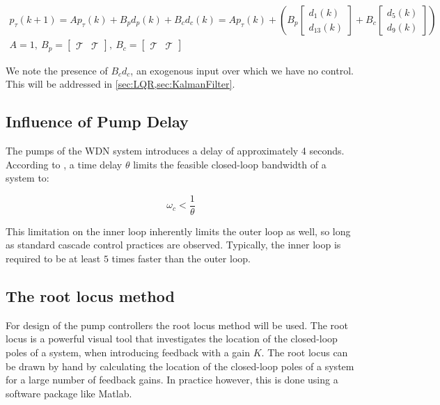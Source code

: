 \begin{equation}\label{eq:TankPressureStateSpace}
	\begin{gathered}
				p_\tau(k+1) = A p_\tau(k) + B_pd_p(k) + B_cd_c(k)
				= A p_\tau(k) + \left(B_p \begin{bmatrix}d_1(k) \\ d_{13}(k)\end{bmatrix} 
				+ B_c\begin{bmatrix}d_5(k) \\ d_9(k)\end{bmatrix}\right) \\      
				A = 1, \ B_p = \begin{bmatrix} \mathcal{T} & \mathcal{T} \end{bmatrix}, \ B_c = \begin{bmatrix} \mathcal{T} & \mathcal{T} \end{bmatrix}
	\end{gathered}
\end{equation}

We note the presence of $B_cd_c$, an exogenous input over which we have no control. This will be addressed in \cref{sec:LQR,sec:KalmanFilter}.

\subsection{Influence of Pump Delay}
The pumps of the WDN system introduces a delay of approximately 4 seconds. According to \cite[pp. 182-183]{Skogestad2005} , 
a time delay $\theta$ limits the feasible closed-loop bandwidth of a system to:

\begin{equation}\label{eq:BWdelay}
	\omega_c < \frac{1}{\theta}
\end{equation}

This limitation on the inner loop inherently limits the outer loop as well, so long as standard cascade control practices are observed. Typically, the inner loop is required to be at least $5$ times faster than the outer loop.



\subsection{The root locus method}

For design of the pump controllers the root locus method will be used. The root locus is a powerful visual tool that investigates the location of the closed-loop poles of a system, when introducing feedback with a gain $K$. The root locus can be drawn by hand by calculating the location of the closed-loop poles of a system for a large number of feedback gains. In practice however, this is done using a software package like Matlab.

